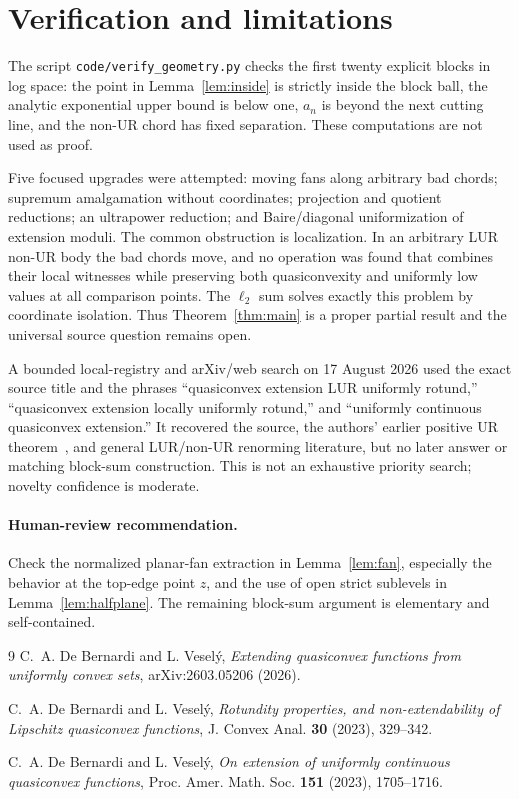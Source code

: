 \documentclass[11pt]{article}
\begin{document}
\section{Verification and limitations}

The script \texttt{code/verify\_geometry.py} checks the first twenty
explicit blocks in log space: the point in Lemma~\ref{lem:inside} is
strictly inside the block ball, the analytic exponential upper bound is
below one, $a_n$ is beyond the next cutting line, and the non-UR chord has
fixed separation.  These computations are not used as proof.

Five focused upgrades were attempted: moving fans along arbitrary bad
chords; supremum amalgamation without coordinates; projection and quotient
reductions; an ultrapower reduction; and Baire/diagonal uniformization of
extension moduli.  The common obstruction is localization.  In an arbitrary
LUR non-UR body the bad chords move, and no operation was found that combines
their local witnesses while preserving both quasiconvexity and uniformly
low values at all comparison points.  The $\ell_2$ sum solves exactly this
problem by coordinate isolation.  Thus Theorem~\ref{thm:main} is a proper
partial result and the universal source question remains open.

A bounded local-registry and arXiv/web search on 17 August 2026 used the
exact source title and the phrases ``quasiconvex extension LUR uniformly
rotund,'' ``quasiconvex extension locally uniformly rotund,'' and
``uniformly continuous quasiconvex extension.''  It recovered the source,
the authors' earlier positive UR theorem~\cite{ucpaper}, and general
LUR/non-UR renorming literature, but no later answer or matching block-sum
construction.  This is not an exhaustive priority search; novelty confidence
is moderate.

\paragraph{Human-review recommendation.}
Check the normalized planar-fan extraction in Lemma~\ref{lem:fan}, especially
the behavior at the top-edge point $z$, and the use of open strict sublevels
in Lemma~\ref{lem:halfplane}.  The remaining block-sum argument is elementary
and self-contained.

\begin{thebibliography}{9}
C.~A. De Bernardi and L. Vesel\'y,
\emph{Extending quasiconvex functions from uniformly convex sets},
arXiv:2603.05206 (2026).

C.~A. De Bernardi and L. Vesel\'y,
\emph{Rotundity properties, and non-extendability of Lipschitz quasiconvex
functions}, J. Convex Anal. \textbf{30} (2023), 329--342.

C.~A. De Bernardi and L. Vesel\'y,
\emph{On extension of uniformly continuous quasiconvex functions},
Proc. Amer. Math. Soc. \textbf{151} (2023), 1705--1716.
\end{thebibliography}
\end{document}

